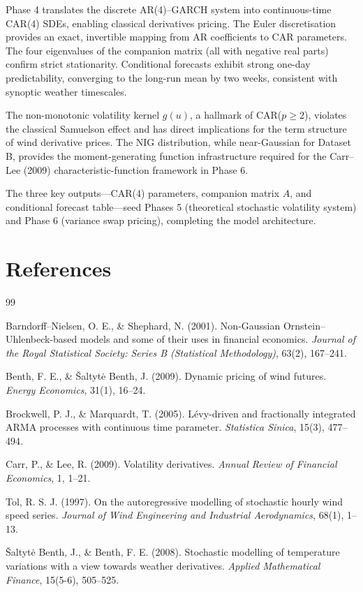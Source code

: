 \documentclass[11pt, a4paper, twoside]{article}
\begin{document}
Phase 4 translates the discrete AR(4)--GARCH system into continuous-time CAR(4) SDEs, enabling classical derivatives pricing. The Euler discretisation provides an exact, invertible mapping from AR coefficients to CAR parameters. The four eigenvalues of the companion matrix (all with negative real parts) confirm strict stationarity. Conditional forecasts exhibit strong one-day predictability, converging to the long-run mean by two weeks, consistent with synoptic weather timescales.

The non-monotonic volatility kernel $g(u)$, a hallmark of CAR($p \geq 2$), violates the classical Samuelson effect and has direct implications for the term structure of wind derivative prices. The NIG distribution, while near-Gaussian for Dataset B, provides the moment-generating function infrastructure required for the Carr--Lee (2009) characteristic-function framework in Phase 6.

The three key outputs---CAR(4) parameters, companion matrix $A$, and conditional forecast table---seed Phases 5 (theoretical stochastic volatility system) and Phase 6 (variance swap pricing), completing the model architecture.

\section*{References}

\begin{thebibliography}{99}

Barndorff--Nielsen, O. E., \& Shephard, N. (2001). Non-Gaussian Ornstein--Uhlenbeck-based models and some of their uses in financial economics. \textit{Journal of the Royal Statistical Society: Series B (Statistical Methodology)}, 63(2), 167--241.

Benth, F. E., \& Šaltytė Benth, J. (2009). Dynamic pricing of wind futures. \textit{Energy Economics}, 31(1), 16--24.

Brockwell, P. J., \& Marquardt, T. (2005). Lévy-driven and fractionally integrated ARMA processes with continuous time parameter. \textit{Statistica Sinica}, 15(3), 477--494.

Carr, P., \& Lee, R. (2009). Volatility derivatives. \textit{Annual Review of Financial Economics}, 1, 1--21.

Tol, R. S. J. (1997). On the autoregressive modelling of stochastic hourly wind speed series. \textit{Journal of Wind Engineering and Industrial Aerodynamics}, 68(1), 1--13.

Šaltytė Benth, J., \& Benth, F. E. (2008). Stochastic modelling of temperature variations with a view towards weather derivatives. \textit{Applied Mathematical Finance}, 15(5-6), 505--525.

\end{thebibliography}
\end{document}
